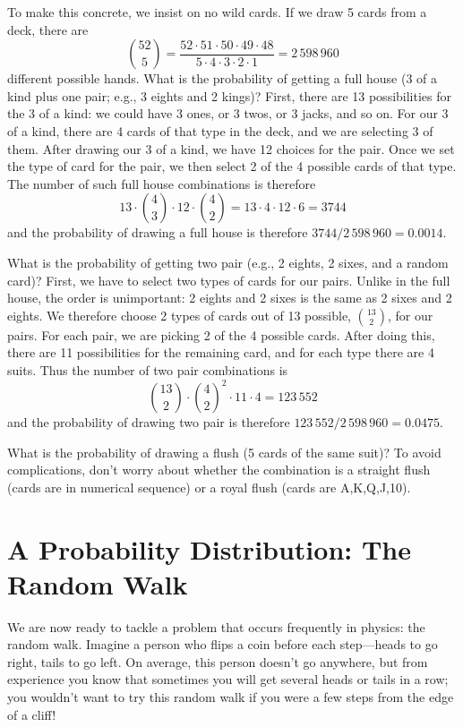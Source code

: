  To make this concrete, we insist on no wild cards.  If we draw 5 cards from a deck, there are
\[
{52\choose5} = \frac{52\cdot51\cdot50\cdot49\cdot48}{5\cdot4\cdot3\cdot2\cdot1} = 2\,598\,960 
\]
different possible hands. What is the probability of getting a full house (3 of a kind plus one pair; e.g., 3 eights and 2 kings)? First, there are 13 possibilities for the 3 of a kind: we could have 3 ones, or 3 twos, or 3 jacks, and so on. For our 3 of a kind, there are 4 cards of that type in the deck, and we are selecting 3 of them. After drawing our 3 of a kind, we have 12 choices for the pair. Once we set the type of card for the pair, we then select 2 of the 4 possible cards of that type. The number of such full house combinations is therefore
\[
	13\cdot{4\choose3}\cdot12\cdot{4\choose2} = 13\cdot 4\cdot12\cdot 6 = 3744
\]
and the probability of drawing a full house is therefore $3744/2\,598\,960 = 0.0014$.

What is the probability of getting two pair (e.g., 2 eights, 2 sixes, and a random card)? First, we have to select two types of cards for our pairs. Unlike in the full house, the order is unimportant: 2 eights and 2 sixes is the same as 2 sixes and 2 eights. We therefore choose 2 types of cards out of 13 possible, ${13\choose 2}$, for our pairs. For each pair, we are picking 2 of the 4 possible cards. After doing this, there are 11 possibilities for the remaining card, and for each type there are 4 suits. Thus the number of two pair combinations is
\[
	{13\choose 2}\cdot{4\choose 2}^{2}\cdot11\cdot4 = 123\,552
\]
and the probability of drawing two pair is therefore $123\,552/2\,598\,960 = 0.0475$.

\begin{exercisebox}
What is the probability of drawing a flush (5 cards of the same suit)? To avoid complications, don't worry about whether the combination is a straight flush (cards are in numerical sequence) or a royal flush (cards are A,K,Q,J,10).
\end{exercisebox}

\section{A Probability Distribution: The Random Walk}
We are now ready to tackle a problem that occurs frequently in physics: the random walk.  Imagine a person who flips a coin before each step---heads to go right, tails to go left.  On average, this person doesn't go anywhere, but from experience you know that sometimes you will get several heads or tails in a row; you wouldn't want to try this random walk if you were a few steps from the edge of a cliff!

